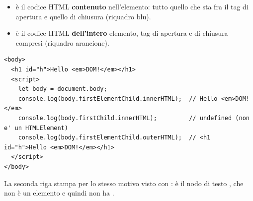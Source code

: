 \begin{affianco}[0.5][c]
\begin{itemize}
  \item {} è il codice HTML \textbf{contenuto} nell'elemento: tutto
        quello che sta fra il tag di apertura e quello di chiusura (riquadro
        blu).
  \item {} è il codice HTML \textbf{dell'intero} elemento, tag di
        apertura e di chiusura compresi (riquadro arancione).
\end{itemize}
\risultato
\begin{immagine}
\end{immagine}
\end{affianco}

\begin{lstlisting}[style=html, name=innerhtml.html]
<body>
  <h1 id="h">Hello <em>DOM!</em></h1>
  <script>
    let body = document.body;
    console.log(body.firstElementChild.innerHTML);  // Hello <em>DOM!</em>
    console.log(body.firstChild.innerHTML);         // undefined (non e' un HTMLElement)
    console.log(body.firstElementChild.outerHTML);  // <h1 id="h">Hello <em>DOM!</em></h1>
  </script>
</body>
\end{lstlisting}

La seconda riga stampa  per lo stesso motivo visto con
:  è il nodo di testo
, che non è un elemento e quindi non ha
.

